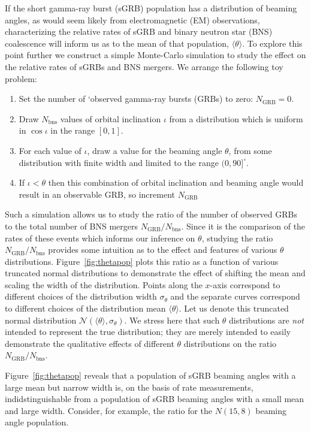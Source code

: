 \documentclass[twocolumn,nofootinbib]{revtex4-1}
\def\bns#1{binary neutron star#1 (BNS#1)\gdef\bns{BNS}}
\def\grb#1{gamma-ray burst#1 (GRB#1)\gdef\grb{GRB}}
\def\sgrb#1{short gamma-ray burst#1 (sGRB#1)\gdef\sgrb{sGRB}}
\def\electro#1{electromagnetic#1 (EM#1)\gdef\electro{EM}}
\begin{document}
If the \sgrb{} population has a distribution of beaming angles, as would seem
likely from \electro{} observations, characterizing the relative rates of
\sgrb{} and \bns{} coalescence will inform us as to the mean of that population,
$\langle \theta \rangle$.  To explore this point further we construct a simple
Monte-Carlo simulation to study the effect on the relative rates of \sgrb{s} and
\bns{} mergers.  We arrange the following toy problem:
%
\begin{enumerate}
    \item Set the number of `observed \grb{s} to zero: $N_{\mathrm{GRB}}=0$.
    \item Draw $N_{\mathrm{bns}}$ values of orbital inclination $\iota$ from a
        distribution which is uniform in $\cos \iota$ in the range $[0,1]$.
    \item For each value of $\iota$, draw a value for the beaming angle
    $\theta$, from some distribution with finite width and limited to the range
$(0,90]^{\circ}$.  
    \item If $\iota<\theta$ then this combination of orbital inclination and
        beaming angle would result in an observable \grb{}, so increment
        $N_{\mathrm{GRB}}$
\end{enumerate}
%
Such a simulation allows us to study the ratio of the number of observed
\grb{s} to the total number of \bns{} mergers $N_{\mathrm{GRB}}/
N_{\mathrm{bns}}$.  Since it is the comparison of the rates of these events
which informs our inference on $\theta$,  studying the ratio $N_{\mathrm{GRB}}
/N_{\mathrm{bns}}$ provides some intuition as to the effect and features of
various $\theta$ distributions.  Figure~\ref{fig:thetapop} plots this ratio as a
function of various truncated normal distributions to demonstrate the effect of
shifting the mean and scaling the width of the distribution. Points along the
$x$-axis correspond to different choices of the distribution width
$\sigma_{\theta}$ and the
separate curves correspond to different choices of the distribution mean
$\langle \theta \rangle$.  Let us denote this truncated normal distribution
${\mathcal N}(\langle \theta \rangle, \sigma_{\theta})$.  We
stress here that such $\theta$ distributions are \emph{not} intended to
represent the true distribution; they are merely intended to easily
demonstrate the qualitative effects of different $\theta$ distributions on the
ratio $N_{\mathrm{GRB}}/N_{\mathrm{bns}}$.

Figure~\ref{fig:thetapop} reveals that a population of \sgrb{} beaming angles
with a large mean but narrow width is, on the basis of rate measurements,
indidstinguishable from a population of \sgrb{} beaming angles with a small mean
and large width.  Consider, for example, the ratio for the $N(15,8)$ beaming
angle population. 
 
\end{document}

